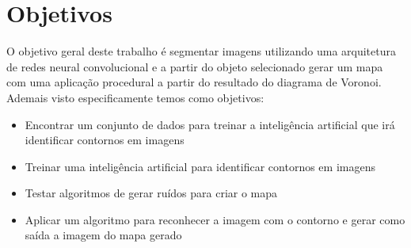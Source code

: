 \section{Objetivos}

O objetivo geral deste trabalho é segmentar imagens utilizando uma arquitetura de redes neural convolucional e a partir do objeto selecionado gerar um mapa com uma aplicação procedural a partir do resultado do diagrama de Voronoi.
Ademais visto especificamente temos como objetivos:

\begin{itemize}
	\item Encontrar um conjunto de dados para treinar a inteligência artificial que irá identificar contornos em imagens
	\item Treinar uma inteligência artificial para identificar contornos em imagens
	\item Testar algoritmos de gerar ruídos para criar o mapa
	\item Aplicar um algoritmo para reconhecer a imagem com o contorno e gerar como saída a imagem do mapa gerado
\end{itemize}

